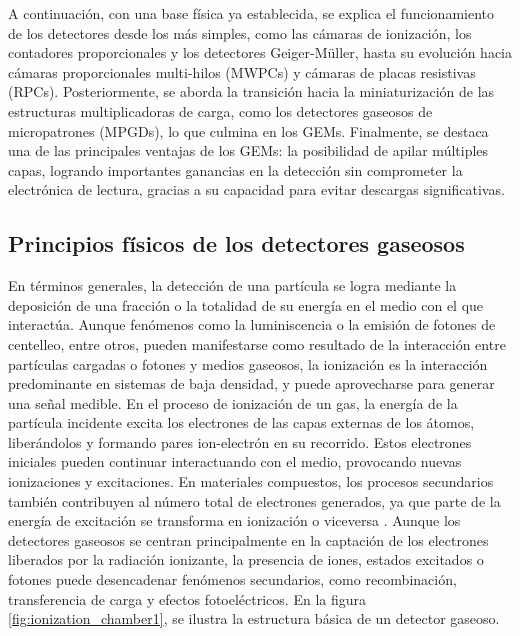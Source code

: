 \documentclass{article}
\begin{document}
\noindent A continuación, con una base física ya establecida, se explica el funcionamiento de los detectores desde los más simples, como las cámaras de ionización, los contadores proporcionales y los detectores Geiger-Müller, hasta su evolución hacia cámaras proporcionales multi-hilos (MWPCs) y cámaras de placas resistivas (RPCs). Posteriormente, se aborda la transición hacia la miniaturización de las estructuras multiplicadoras de carga, como los detectores gaseosos de micropatrones (MPGDs), lo que culmina en los GEMs. Finalmente, se destaca una de las principales ventajas de los GEMs: la posibilidad de apilar múltiples capas, logrando importantes ganancias en la detección sin comprometer la electrónica de lectura, gracias a su capacidad para evitar descargas significativas.

\subsection{Principios físicos de los detectores gaseosos}

\noindent En términos generales, la detección de una partícula se logra mediante la deposición de una fracción o la totalidad de su energía en el medio con el que interactúa. Aunque fenómenos como la luminiscencia o la emisión de fotones de centelleo, entre otros, pueden manifestarse como resultado de la interacción entre partículas cargadas o fotones y medios gaseosos, la ionización es la interacción predominante en sistemas de baja densidad, y puede aprovecharse para generar una señal medible. En el proceso de ionización de un gas, la energía de la partícula incidente excita los electrones de las capas externas de los átomos, liberándolos y formando pares ion-electrón en su recorrido. Estos electrones iniciales pueden continuar interactuando con el medio, provocando nuevas ionizaciones y excitaciones. En materiales compuestos, los procesos secundarios también contribuyen al número total de electrones generados, ya que parte de la energía de excitación se transforma en ionización o viceversa \cite{kolanoski2020particle1}. Aunque los detectores gaseosos se centran principalmente en la captación de los electrones liberados por la radiación ionizante, la presencia de iones, estados excitados o fotones puede desencadenar fenómenos secundarios, como recombinación, transferencia de carga y efectos fotoeléctricos. En la figura \ref{fig:ionization_chamber1}, se ilustra la estructura básica de un detector gaseoso.
\end{document}
